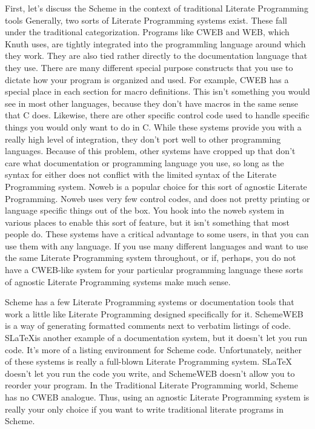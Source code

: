 %
First, let's discuss the Scheme in the context of traditional Literate
Programming tools Generally, two sorts of Literate
Programming systems exist.  These fall under the traditional
categorization.
Programs like CWEB and WEB, which Knuth uses, are tightly integrated
into the programmling language around which they work.  They are also
tied rather directly to the documentation language that they use.
There are many different special purpose constructs that you use to
dictate how your program is organized and used.  For example, CWEB has
a special place in each section for macro definitions.  This isn't
something you would see in most other languages, because they don't
have macros in the same sense that C does.  Likewise, there are other
specific control code used to handle specific things you would only
want to do in C. While these systems provide you with a really high
level of integration, they don't port well to other programming
languages.  Because of this problem, other systems have cropped up
that don't care what documentation or programming language you use, so
long as the syntax for either does not conflict with the limited
syntax of the Literate Programming system.  Noweb is a popular choice
for this sort of agnostic Literate Programming.  Noweb uses very few
control codes, and does not pretty printing or language specific
things out of the box.  You hook into the noweb system in various
places to enable this sort of feature, but it isn't something that
most people do.  These systems have a critical advantage to some
users, in that you can use them with any language.  If you use many
different languages and want to use the same Literate Programming
system throughout, or if, perhaps, you do not have a CWEB-like system
for your particular programming language these sorts of agnostic
Literate Programming systems make much sense.

Scheme has a few Literate Programming systems or documentation tools
that work a little like Literate Programming designed specifically for
it.  SchemeWEB is a way of generating formatted comments next to
verbatim listings of code.  S\LaTeX is another example of a
documentation system, but it doesn't let you run code.  It's more of a
listing environment for Scheme code.  Unfortunately, neither of these
systems is really a full-blown Literate Programming system.  SLaTeX
doesn't let you run the code you write, and SchemeWEB doesn't allow
you to reorder your program.  In the Traditional Literate Programming
world, Scheme has no CWEB analogue.  Thus, using an agnostic Literate
Programming system is really your only choice if you want to write
traditional literate programs in Scheme.

